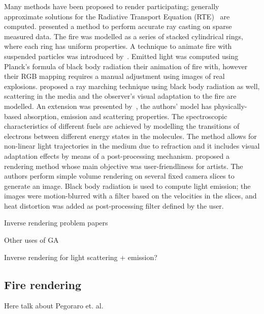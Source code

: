 \documentclass{acmsiggraph}
\begin{document}
Many methods have been proposed to render participating; generally approximate solutions for the Radiative Transport Equation (RTE)~\cite{Howell:2002} are computed. 
\cite{Rushmeier:1995} presented a method to perform accurate ray casting on sparse measured data.
The fire was modelled as a series of stacked cylindrical rings, where each ring has uniform properties.
A technique to animate fire with suspended particles was introduced by~\cite{Feldman:2003}.
Emitted light was computed using Planck's formula of black body radiation their animation of fire with, however their RGB mapping requires a manual adjustment using images of real explosions.
\cite{Nguyen:2002} proposed a ray marching technique using black body radiation as well, scattering in the media and the observer's visual adaptation to the fire are modelled.
An extension was presented by~\cite{Pegoraro:2006}, the authors' model has physically-based absorption, emission and scattering properties.
The spectroscopic characteristics of different fuels are achieved by modelling the transitions of electrons between different energy states in the molecules.
The method allows for non-linear light trajectories  in the medium due to refraction and it includes visual adaptation effects by means of a post-processing mechanism.
\cite{Horvath:2009} proposed a rendering method whose main objective was user-friendliness for artists.
The authors perform simple volume rendering on several fixed camera slices to generate an image.
Black body radiation is used to compute light emission; the images were motion-blurred with a filter based on the velocities in the slices, and heat distortion was added as post-processing filter defined by the user. 

Inverse rendering problem papers

Other uses of GA

Inverse rendering for light scattering + emission?

\subsection{Fire rendering}

Here talk about Pegoraro et. al.
\end{document}
